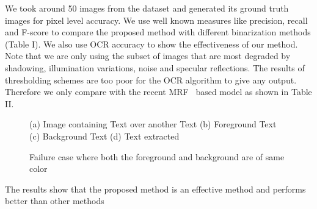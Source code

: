 We took around 50
images from the dataset and generated its ground truth images for pixel level accuracy.
We use well known measures like precision, recall and F-score to
compare the proposed method with different binarization methods (Table I).
We also use OCR accuracy to show the effectiveness of our method. Note that we are only
using the subset of images that are most degraded by shadowing, illumination variations,
noise and specular reflections. The results of thresholding schemes are too poor for the
OCR algorithm to give any output. Therefore we only compare with the recent MRF~\cite{A16}
based model as shown in Table II.

\begin{figure}[t]
\centering
{}
\caption
{(a) Image containing Text over another Text (b) Foreground Text (c) Background Text (d)
Text extracted}
\caption
{Failure case where both the foreground and background are of same color}
\label{fig:7}
\end{figure}
The results show that the proposed method is an effective method and performs better than other methods 
